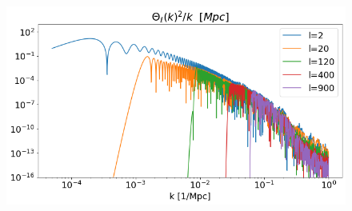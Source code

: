 \documentclass[10pt, a4paper]{article}
\begin{document}
\begin{figure}[h!]
    \centering
    \includegraphics[scale=0.5]{../m4_figs/Theta2.png}
    \caption{}
    \label{}
\end{figure}



\newpage


\end{document}
